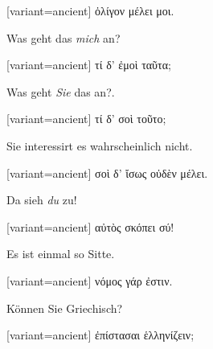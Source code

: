 \switchcolumn

\begin{greek}[variant=ancient]%
\vspace{0.5em}
ὀλίγον μέλει μοι.

\end{greek}%
\switchcolumn*

Was geht das \emph{mich} an?

\switchcolumn

\begin{greek}[variant=ancient]%
τί δ' ἐμοὶ ταῦτα;

\end{greek}%
\switchcolumn*

Was geht \emph{Sie} das an?.

\switchcolumn

\begin{greek}[variant=ancient]%
τί δ' σοὶ τοῦτο;

\end{greek}%
\switchcolumn*

Sie interessirt es wahrscheinlich nicht.

\switchcolumn

\begin{greek}[variant=ancient]%
σοὶ δ' ἴσως οὐδὲν μέλει.

\end{greek}%
\switchcolumn*

Da sieh \emph{du} zu!

\switchcolumn

\begin{greek}[variant=ancient]%
αὐτὸς σκόπει σύ!

\end{greek}%
\switchcolumn*

Es ist einmal so Sitte.

\switchcolumn

\begin{greek}[variant=ancient]%
νόμος γάρ ἐστιν.

\end{greek}%
\indent Können Sie Griechisch?

\switchcolumn

\begin{greek}[variant=ancient]%
ἐπίστασαι ἑλληνίζειν;

\end{greek}%
\switchcolumn*

